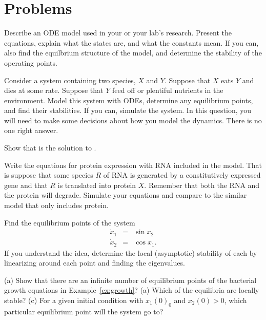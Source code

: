 \section{Problems}

\setcounter{exercount}{0}

\begin{exercise}
  Describe an ODE model used in your or your lab's research. Present the equations, explain what 
  the states are, and what the constants mean. If you can, also find the equilbrium structure of
  the model, and determine the stability of the operating points.
\end{exercise}

\begin{exercise} 
  Consider a system containing two species, $X$ and $Y$.
  Suppose that $X$ eats $Y$ and dies at some rate.
  Suppose that $Y$ feed off or plentiful nutrients in the environment.
  Model this system with ODEs, determine any equilibrium points, and find their stabilities.
  If you can, simulate the system.
  In this question, you will need to make some decisions about how you model the dynamics. There 
  is no one right answer.
\end{exercise}

\begin{exercise}
  Show that  is the solution to
  .
\end{exercise}

\begin{exercise}
  Write the equations for protein expression with RNA
  included in the model. That is suppose that some species $R$ of RNA
  is generated by a constitutively expressed gene and that $R$ is
  translated into protein $X$. Remember that both the RNA and the
  protein will degrade. Simulate your equations and compare to the
  similar model that only includes protein. 
\end{exercise}

\begin{exercise}
Find the equilibrium points of the system
%
\begin{eqnarray*}
\dot x_1 & = & \sin x_2 \\
\dot x_2 & = & \cos x_1 .
\end{eqnarray*}
%
If you understand the idea, determine the local (asymptotic) stability
of each by linearizing around each point and finding the eigenvalues.
\end{exercise}

\begin{exercise}
  (a) Show that there are an infinite number of equilibrium points of
  the bacterial growth equations in Example~\ref{ex:growth}? (a) Which
  of the equilibria are locally stable? (c) For a given initial
  condition with $x_1(0)_0$ and $x_2(0)>0$, which particular
  equilibrium point will the system go to?
\end{exercise}

